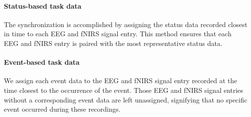 \paragraph{Status-based task data} The synchronization is accomplished by assigning the status data recorded closest in time to each EEG and fNIRS signal entry. This method ensures that each EEG and fNIRS entry is paired with the most representative status data.

\paragraph{Event-based task data} We assign each event data to the EEG and fNIRS signal entry recorded at the time closest to the occurrence of the event. Those EEG and fNIRS signal entries without a corresponding event data are left unassigned, signifying that no specific event occurred during these recordings.


